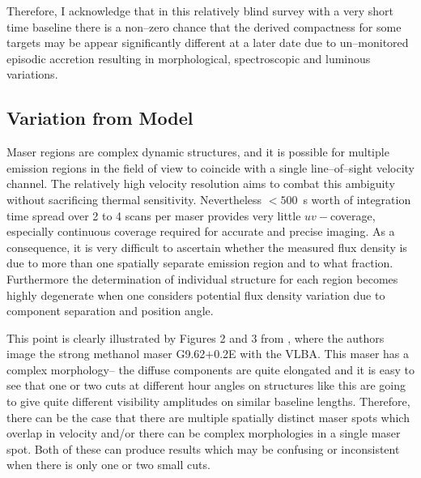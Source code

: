         Therefore, I acknowledge that in this relatively blind survey with a very short time baseline there is a non--zero chance that the derived compactness for some targets may be appear significantly different at a later date due to un--monitored episodic accretion resulting in morphological, spectroscopic and luminous variations. 
        
    \subsection{Variation from Model}
        \label{sec:badmodel}
        Maser regions are complex dynamic structures, and it is possible for multiple emission regions in the field of view to coincide with a single line--of--sight velocity channel. The relatively high velocity resolution aims to combat this ambiguity without sacrificing thermal sensitivity. Nevertheless $<500$~s worth of integration time spread over 2 to 4 scans per maser provides very little $uv-$coverage, especially continuous coverage required for accurate and precise imaging. As a consequence, it is very difficult to ascertain whether the measured flux density is due to more than one spatially separate emission region and to what fraction. Furthermore the determination of individual structure for each region becomes highly degenerate when one considers potential flux density variation due to component separation and position angle. 
        
        This point is clearly illustrated by Figures 2 and 3 from \citet{Goehart2005}, where the authors image the strong methanol maser G9.62$+$0.2E with the VLBA. This maser has a complex morphology-- the diffuse components are quite elongated and it is easy to see that one or two cuts at different hour angles on structures like this are going to give quite different visibility amplitudes on similar baseline lengths. Therefore, there can be the case that there are multiple spatially distinct maser spots which overlap in velocity and/or there can be complex morphologies in a single maser spot. Both of these can produce results which may be confusing or inconsistent when there is only one or two small cuts.

	\clearpage
